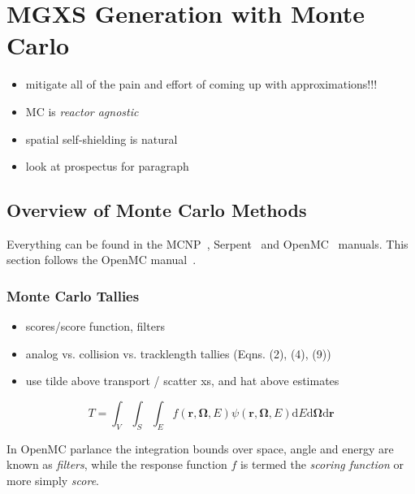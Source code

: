 \chapter{MGXS Generation with Monte Carlo}
\label{chap:mgxs-mc}

\begin{itemize}[noitemsep]
  \item mitigate all of the pain and effort of coming up with approximations!!!
  \item \ac{MC} is \emph{reactor agnostic}
  \item spatial self-shielding is natural
  \item look at prospectus for paragraph
\end{itemize}


\section{Overview of Monte Carlo Methods}
\label{sec:chap3-mc-overview}

Everything can be found in the MCNP~\cite{mcnpx2003manual}, Serpent~\cite{serpent2013manual} and OpenMC~\cite{openmc2016manual} manuals. This section follows the OpenMC manual~\cite{openmc2016manual}.

\subsection{Monte Carlo Tallies}
\label{subsec:chap3-mc-tallies}

\begin{itemize}[noitemsep]
  \item scores/score function, filters
  \item analog vs. collision vs. tracklength tallies (Eqns. (2), (4), (9))
  \item use tilde above transport / scatter xs, and hat above estimates
\end{itemize}

\begin{dmath}
\label{eqn:chap3-tallies-general}
T = \int_{V} \int_{S} \int_{E}  f(\mathbf{r},\mathbf{\Omega},E)\psi(\mathbf{r},\mathbf{\Omega},E)\mathrm{d}E\mathrm{d}\mathbf{\Omega}\mathrm{d}\mathbf{r} 
\end{dmath}

In OpenMC parlance the integration bounds over space, angle and energy are known as \textit{filters}, while the response function $f$ is termed the \textit{scoring function} or more simply \textit{score}.

